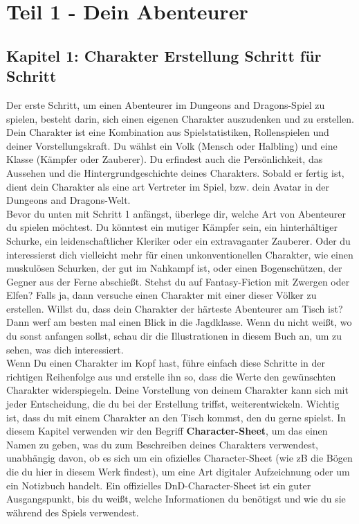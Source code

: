 \chapter{Teil 1 - Dein Abenteurer}
\section{Kapitel 1: Charakter Erstellung Schritt für Schritt}
Der erste Schritt, um einen Abenteurer im Dungeons and Dragons-Spiel zu spielen, besteht darin, sich einen eigenen Charakter auszudenken und zu erstellen. Dein Charakter ist eine Kombination aus Spielstatistiken, Rollenspielen und deiner Vorstellungskraft. Du wählst ein Volk (Mensch oder Halbling) und eine Klasse (Kämpfer oder Zauberer). Du erfindest auch die Persönlichkeit, das Aussehen und die Hintergrundgeschichte deines Charakters. Sobald er fertig ist, dient dein Charakter als eine art Vertreter im Spiel, bzw. dein Avatar in der Dungeons and Dragons-Welt.\\
Bevor du unten mit Schritt 1 anfängst, überlege dir, welche Art von Abenteurer du spielen möchtest. Du könntest ein mutiger Kämpfer sein, ein hinterhältiger Schurke, ein leidenschaftlicher Kleriker oder ein extravaganter Zauberer. Oder du interessierst dich vielleicht mehr für einen unkonventionellen Charakter, wie einen muskulösen Schurken, der gut im Nahkampf ist, oder einen Bogenschützen, der Gegner aus der Ferne abschießt. Stehst du auf Fantasy-Fiction mit Zwergen oder Elfen? Falls ja, dann versuche einen Charakter mit einer dieser Völker zu erstellen. Willst du, dass dein Charakter der härteste Abenteurer am Tisch ist? Dann werf am besten mal einen Blick in die Jagdklasse. Wenn du nicht weißt, wo du sonst anfangen sollst, schau dir die Illustrationen in diesem Buch an, um zu sehen, was dich interessiert.\\
Wenn Du einen Charakter im Kopf hast, führe einfach diese Schritte in der richtigen Reihenfolge aus und erstelle ihn so, dass die Werte den gewünschten Charakter widerspiegeln. Deine Vorstellung von deinem Charakter kann sich mit jeder Entscheidung, die du bei der Erstellung triffst, weiterentwickeln. Wichtig ist, dass du mit einem Charakter an den Tisch kommst, den du gerne spielst. In diesem Kapitel verwenden wir den Begriff \textbf{Character-Sheet}, um das einen Namen zu geben, was du zum Beschreiben deines Charakters verwendest, unabhängig davon, ob es sich um ein ofizielles Character-Sheet (wie zB die Bögen die du hier in diesem Werk findest), um eine Art digitaler Aufzeichnung oder um ein Notizbuch handelt. Ein offizielles DnD-Character-Sheet ist ein guter Ausgangspunkt, bis du weißt, welche Informationen du benötigst und wie du sie während des Spiels verwendest.
